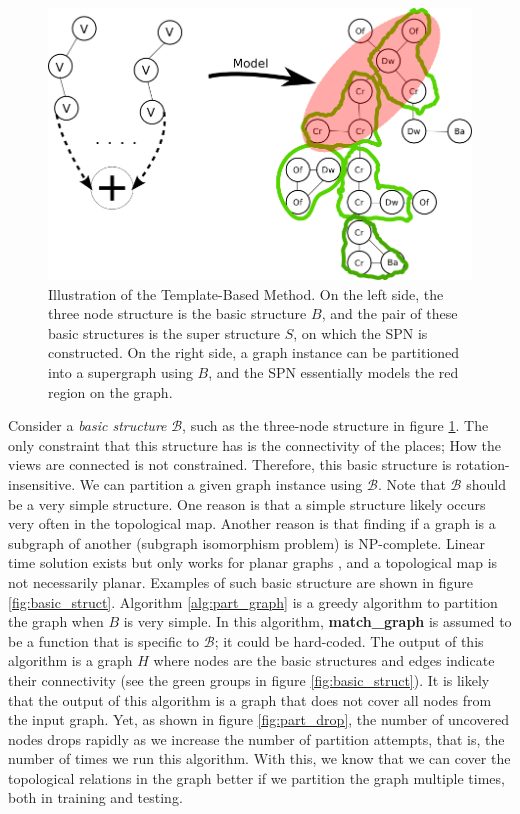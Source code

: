 \documentclass[11pt, titlepage]{article}
\theoremstyle{definition}
\begin{document}
\begin{figure}[!htb]
    \centering
    \captionsetup{width=.8\linewidth}
    \includegraphics[scale=0.4]{images/big_graph.png}
    \caption{Illustration of the Template-Based Method. On the left side, the three node structure is the basic structure $B$, and the pair of these basic structures is the super structure $S$, on which the SPN is constructed. On the right side, a graph instance can be partitioned into a supergraph using $B$, and the SPN essentially models the red region on the graph.}
    \label{fig:tmpmod}
\end{figure}

Consider a \textit{basic structure} $\mathcal{B}$, such as the three-node structure in figure \ref{fig:tmpmod}. The only constraint that this structure has is the connectivity of the places; How the views are connected is not constrained. Therefore, this basic structure is rotation-insensitive. We can partition a given graph instance using $\mathcal{B}$. Note that $\mathcal{B}$ should be a very simple structure. One reason is that a simple structure likely occurs very often in the topological map. Another reason is that finding if a graph is a subgraph of another (subgraph isomorphism problem) is NP-complete. Linear time solution exists but only works for planar graphs \cite{eppstein1995subgraph}, and a topological map is not necessarily planar. Examples of such basic structure are shown in figure \ref{fig:basic_struct}. Algorithm \ref{alg:part_graph} is a greedy algorithm to partition the graph when $B$ is very simple. In this algorithm, \textbf{match\_graph} is assumed to be a function that is specific to $\mathcal{B}$; it could be hard-coded. The output of this algorithm is a graph $H$ where nodes are the basic structures and edges indicate their connectivity (see the green groups in figure \ref{fig:basic_struct}). It is likely that the output of this algorithm is a graph that does not cover all nodes from the input graph. Yet, as shown in figure \ref{fig:part_drop}, the number of uncovered nodes drops rapidly as we increase the number of partition attempts, that is, the number of times we run this algorithm. With this, we know that we can cover the topological relations in the graph better if we partition the graph multiple times, both in training and testing.
\end{document}
